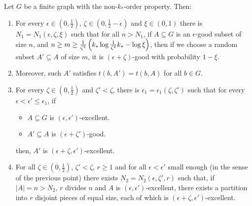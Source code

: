     \lemma[Claim 5.13]\label{claim_5.13}
        Let $G$ be a finite graph with the non-$k_{*}$-order property.
        Then:
        \begin{enumerate}[label=(\alph*), ref=\alph*]
            \item \label{itm:5.13.1} For every $\epsilon \in \left(0, \frac{1}{2}\right)$,
                $\zeta \in \left(0, \frac{1}{2} - \epsilon \right)$ and $\xi \in \left(0, 1 \right)$ there is
                $N_1 = N_1\left(\epsilon, \zeta, \xi \right)$ such that for all $n > N_1$, if $A \subseteq G$ is an
                $\epsilon$-good subset of size $n$, and $n \geq m \geq \frac{1}{\zeta^2}\left( k_* \log{\frac{1}{\zeta^2}k_*} - \log{\xi} \right)$,
                then if we choose a random subset $A' \subseteq A$ of size $m$, it is $(\epsilon + \zeta)$-good
                with probability $1-\xi$.
            \item \label{itm:5.13.1*} Moreover, such $A'$ satisfies $t(b, A') = t(b, A)$ for all $b \in G$.
            \item \label{itm:5.13.2} For every $\zeta \in \left(0, \frac{1}{2}\right)$ and $\zeta' < \zeta$, there is
                $\epsilon_1 = \epsilon_1(\zeta, \zeta')$ such that for every $\epsilon < \epsilon' \leq \epsilon_1$, if
                \begin{itemize}
                    \item $A \subseteq G$ is $\left( \epsilon, \epsilon' \right)$-excellent.
                    \item $A' \subseteq A$ is $\left( \epsilon + \zeta' \right)$-good.
                \end{itemize}
                then, $A'$ is $\left( \epsilon + \zeta, \epsilon' \right)$-excellent.
            \item \label{itm:5.13.3} For all $\zeta \in \left(0, \frac{1}{2}\right)$, $\zeta' < \zeta$, $r \geq 1$ and for all
                $\epsilon < \epsilon'$ small enough (in the sense of the previous point) there exists
                $N_2 = N_2\left(\epsilon, \zeta', r \right)$ such that, if $|A| = n > N_2$, $r$ divides $n$ and $A$ is
                $\left( \epsilon, \epsilon' \right)$-excellent, there exists a partition into $r$ disjoint pieces of equal
                size, each of which is $\left( \epsilon + \zeta, \epsilon' \right)$-excellent.
        \end{enumerate}
